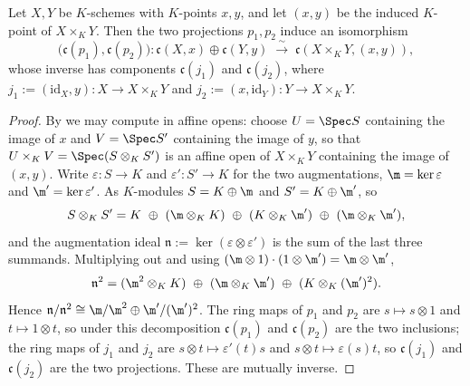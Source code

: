 \begin{lemma}\label{lem:av-cotangent-product}
Let $X,Y$ be $K$-schemes with $K$-points $x,y$, and let $(x,y)$ be the induced
$K$-point of $X\times_KY$.  Then the two projections $p_1,p_2$ induce an
isomorphism
\[
  \bigl(\mathfrak c(p_1),\mathfrak c(p_2)\bigr)\colon
  \mathfrak c(X,x)\oplus\mathfrak c(Y,y)\;\xrightarrow{\ \sim\ }\;
  \mathfrak c(X\times_KY,(x,y)),
\]
whose inverse has components $\mathfrak c(j_1)$ and $\mathfrak c(j_2)$, where
$j_1:=(\mathrm{id}_X,y)\colon X\to X\times_KY$ and
$j_2:=(x,\mathrm{id}_Y)\colon Y\to X\times_KY$.
\end{lemma}
\begin{proof}
By  we may compute in affine opens: choose
$U=\Spec S$ containing the image of $x$ and $V=\Spec S'$ containing the image
of $y$, so that $U\times_KV=\Spec(S\otimes_KS')$ is an affine open of
$X\times_KY$ containing the image of $(x,y)$.  Write $\varepsilon\colon S\to K$
and $\varepsilon'\colon S'\to K$ for the two augmentations,
$\m=\ker\varepsilon$ and $\m'=\ker\varepsilon'$.  As $K$-modules $S=K\oplus\m$
and $S'=K\oplus\m'$, so
\[
  S\otimes_KS'=K\ \oplus\ (\m\otimes_KK)\ \oplus\ (K\otimes_K\m')\ \oplus\
  (\m\otimes_K\m'),
\]
and the augmentation ideal $\mathfrak n:=\ker(\varepsilon\otimes\varepsilon')$
is the sum of the last three summands.  Multiplying out and using
$(\m\otimes1)\cdot(1\otimes\m')=\m\otimes\m'$,
\[
  \mathfrak n^2=(\m^2\otimes_KK)\ \oplus\ (\m\otimes_K\m')\ \oplus\
  (K\otimes_K(\m')^2).
\]
Hence $\mathfrak n/\mathfrak n^2\cong\m/\m^2\oplus\m'/(\m')^2$.  The ring maps of
$p_1$ and $p_2$ are $s\mapsto s\otimes1$ and $t\mapsto1\otimes t$, so under
this decomposition $\mathfrak c(p_1)$ and $\mathfrak c(p_2)$ are the two
inclusions; the ring maps of $j_1$ and $j_2$ are
$s\otimes t\mapsto\varepsilon'(t)s$ and $s\otimes t\mapsto\varepsilon(s)t$, so
$\mathfrak c(j_1)$ and $\mathfrak c(j_2)$ are the two projections.  These are
mutually inverse.
\end{proof}


